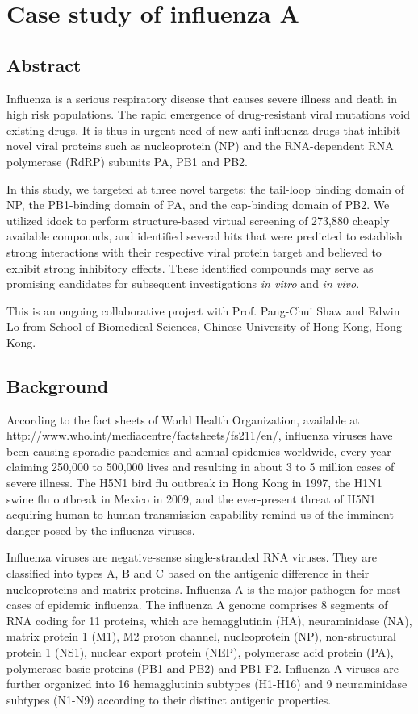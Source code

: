 \chapter{Case study of influenza A}
\label{influenza}

\section{Abstract}

Influenza is a serious respiratory disease that causes severe illness and death in high risk populations. The rapid emergence of drug-resistant viral mutations void existing drugs. It is thus in urgent need of new anti-influenza drugs that inhibit novel viral proteins such as nucleoprotein (NP) and the RNA-dependent RNA polymerase (RdRP) subunits PA, PB1 and PB2.

In this study, we targeted at three novel targets: the tail-loop binding domain of NP, the PB1-binding domain of PA, and the cap-binding domain of PB2. We utilized idock to perform structure-based virtual screening of 273,880 cheaply available compounds, and identified several hits that were predicted to establish strong interactions with their respective viral protein target and believed to exhibit strong inhibitory effects. These identified compounds may serve as promising candidates for subsequent investigations \textit{in vitro} and \textit{in vivo}.

This is an ongoing collaborative project with Prof. Pang-Chui Shaw and Edwin Lo from School of Biomedical Sciences, Chinese University of Hong Kong, Hong Kong.

\section{Background}

According to the fact sheets of World Health Organization, available at http://www.who.int/mediacentre/factsheets/fs211/en/, influenza viruses have been causing sporadic pandemics and annual epidemics worldwide, every year claiming 250,000 to 500,000 lives and resulting in about 3 to 5 million cases of severe illness. The H5N1 bird flu outbreak in Hong Kong in 1997, the H1N1 swine flu outbreak in Mexico in 2009, and the ever-present threat of H5N1 acquiring human-to-human transmission capability remind us of the imminent danger posed by the influenza viruses.

Influenza viruses are negative-sense single-stranded RNA viruses. They are classified into types A, B and C based on the antigenic difference in their nucleoproteins and matrix proteins. Influenza A is the major pathogen for most cases of epidemic influenza. The influenza A genome comprises 8 segments of RNA coding for 11 proteins, which are hemagglutinin (HA), neuraminidase (NA), matrix protein 1 (M1), M2 proton channel, nucleoprotein (NP), non-structural protein 1 (NS1), nuclear export protein (NEP), polymerase acid protein (PA), polymerase basic proteins (PB1 and PB2) and PB1-F2. Influenza A viruses are further organized into 16 hemagglutinin subtypes (H1-H16) and 9 neuraminidase subtypes (N1-N9) according to their distinct antigenic properties.

